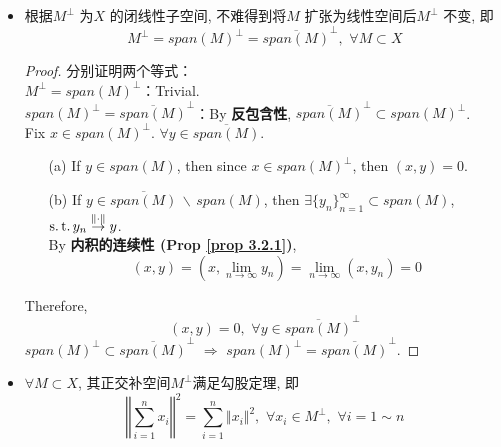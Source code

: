 \begin{defn}
\begin{rmk}
\begin{itemize}
				\newpage
				
				\item 根据$M^{\perp}$ 为$X$ 的闭线性子空间, 不难得到将$M$ 扩张为线性空间后$M^{\perp}$ 不变, 即
				\[ M^{\perp} = span(M)^{\perp} = \overline{span(M)}^{\perp} , \,\, \forall M \subset X \]
				
				\vspace{3em}
				
				\begin{proof}
					分别证明两个等式：\\
					$M^{\perp} = span(M)^{\perp}$：Trivial. \\
					$span(M)^{\perp} = \overline{span(M)}^{\perp}$：By \textbf{反包含性}, $\overline{span(M)}^{\perp} \subset span(M)^{\perp}$. \\
					Fix $x \in span(M)^{\perp}$. $\forall y \in \overline{span(M)}$. 
					\begin{enumerate}
						\item[(a)] If $y \in span(M)$, then since $x \in span(M)^{\perp}$, then $(x , y) = 0$. 
						
						\item[(b)] If $y \in \overline{span(M)} \, \backslash \, span(M)$, then $\exists \{ y_n \}_{n = 1}^{\infty} \subset span(M)$, $\operatorname{s.t.} y_n \overset{\Vert \cdot \Vert}{\to} y$. \\
						By \textbf{内积的连续性 (Prop \ref{prop 3.2.1})}, 
						\[ (x , y) 
						= \left( x , \lim_{n \to \infty} y_n \right) 
						= \lim_{n \to \infty} (x , y_n) 
						= 0 \]
					\end{enumerate}
					Therefore, 
					\[ (x , y) = 0 , \,\, \forall y \in \overline{span(M)}^{\perp} \]
					$span(M)^{\perp} \subset \overline{span(M)}^{\perp} \,\, \Rightarrow \,\, span(M)^{\perp} = \overline{span(M)}^{\perp}$.
				\end{proof}
				
				\vspace{8em}
				
				\item $\forall M \subset X$, 其正交补空间$M^{\perp}$满足勾股定理, 即
				\[ \left\Vert \sum_{i = 1}^{n} x_i \right\Vert^2 = \sum_{i = 1}^n \Vert x_i \Vert^2 , \,\, \forall x_i \in M^{\perp} , \,\, \forall i = 1 \sim n \]
				
				\vspace{3em}
				

\end{itemize}
\end{rmk}
\end{defn}
